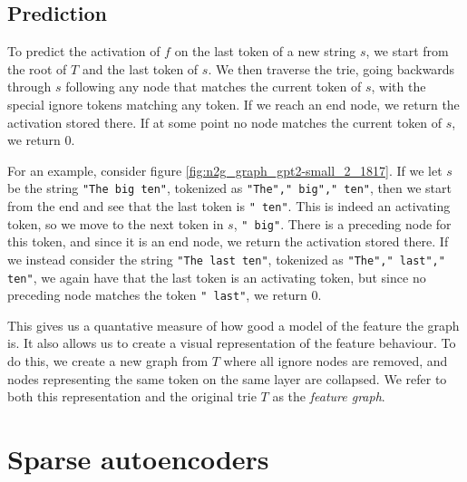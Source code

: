 \subsection{Prediction}
\label{sec:n2g_prediction}
To predict the activation of $f$ on the last token of a new string $s$, 
we start from the root of $T$ and the last token of $s$.
We then traverse the trie, going backwards through $s$ 
following any node that matches the current token of $s$, 
with the special ignore tokens matching any token.
If we reach an end node, we return the activation stored there.
If at some point no node matches the current token of $s$, 
we return $0$.

For an example, consider figure \ref{fig:n2g_graph_gpt2-small_2_1817}.
If we let $s$ be the string \texttt{"The big ten"}, tokenized as \texttt{"The"," big"," ten"}, then we start from the end and see that the last token is \texttt{" ten"}.
This is indeed an activating token, so we move to the next token in $s$, \texttt{" big"}.
There is a preceding node for this token, and since it is an end node, we return the activation stored there.
If we instead consider the string \texttt{"The last ten"}, tokenized as \texttt{"The"," last"," ten"}, we again have that the last token is an activating token, but since no preceding node matches the token \texttt{" last"}, we return $0$.

This gives us a quantative measure of how good a model of the feature 
the graph is.
It also allows us to create a visual representation 
of the feature behaviour.
To do this, we create a new graph from $T$ 
where all ignore nodes are removed, 
and nodes representing the same token on the same layer are collapsed.
We refer to both this representation and the original trie $T$ 
as the \emph{feature graph}.


\section{Sparse autoencoders}
\label{sec:sae}
